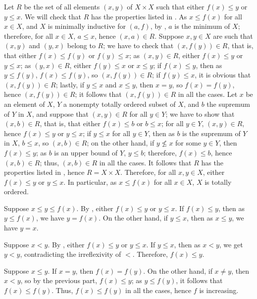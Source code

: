 \documentclass{article}
\begin{document}
\begin{solution}[\ref{exe:yf8euudc}]
  \label{sol:k2kxymc8}
  Let \(R\) be the set of all elements \((x, y)\) of \(X \times X\)
  such that either \(f(x) \leq y\) or \(y \leq x\).  We will check
  that \(R\) has the properties listed in .  As
  \(x \leq f(x)\) for all \(x \in X\), and \(X\) is minimally
  inductive for \((a, f)\), by , \(a\) is the
  minimum of \(X\); therefore, for all \(x \in X\), \(a \leq x\),
  hence \((x, a) \in R\).  Suppose \(x, y \in X\) are such that
  \((x,y)\) and \((y, x)\) belong to \(R\); we have to check that
  \((x, f(y)) \in R\), that is, that either \(f(x) \leq f(y)\) or
  \(f(y) \leq x\); as \((x, y) \in R\), either \(f(x) \leq y\) or
  \(y \leq x\); as \((y, x) \in R\), either \(f(y) \leq x\) or
  \(x \leq y\); if \(f(x) \leq y\), then as \(y \leq f(y)\),
  \(f(x) \leq f(y)\), so \((x, f(y)) \in R\); if \(f(y) \leq x\), it
  is obvious that \((x,f(y)) \in R\); lastly, if \(y \leq x\) and
  \(x \leq y\), then \(x = y\), so \(f(x) = f(y)\), hence
  \((x,f(y)) \in R\); it follows that \((x, f(y)) \in R\) in all the
  cases.  Let \(x\) be an element of \(X\), \(Y\) a nonempty totally
  ordered subset of \(X\), and \(b\) the supremum of \(Y\) in \(X\),
  and suppose that \((x, y) \in R\) for all \(y \in Y\); we have to
  show that \((x, b) \in R\), that is, that either \(f(x) \leq b\) or
  \(b \leq x\); for all \(y \in Y\), \((x, y) \in R\), hence
  \(f(x) \leq y\) or \(y \leq x\); if \(y \leq x\) for all
  \(y \in Y\), then as \(b\) is the supremum of \(Y\) in \(X\),
  \(b \leq x\), so \((x, b) \in R\); on the other hand, if
  \(y \nleq x\) for some \(y \in Y\), then \(f(x) \leq y\); as \(b\)
  is an upper bound of \(Y\), \(y \leq b\); therefore,
  \(f(x) \leq b\), hence \((x, b) \in R\); thus, \((x, b) \in R\) in
  all the cases.  It follows that \(R\) has the properties listed in
  , hence \(R = X \times X\).  Therefore, for all
  \(x, y \in X\), either \(f(x) \leq y\) or \(y \leq x\).  In
  particular, as \(x \leq f(x)\) for all \(x \in X\), \(X\) is totally
  ordered.
\end{solution}

\begin{solution}[\ref{exe:htz5ftfy}]
  \label{sol:h2e8o5az}
  Suppose \(x \leq y \leq f(x)\).  By , either
  \(f(x) \leq y\) or \(y \leq x\).  If \(f(x) \leq y\), then as
  \(y \leq f(x)\), we have \(y = f(x)\).  On the other hand, if
  \(y \leq x\), then as \(x \leq y\), we have \(y = x\).

  Suppose \(x < y\).  By , either \(f(x) \leq y\)
  or \(y \leq x\).  If \(y \leq x\), then as \(x < y\), we get
  \(y < y\), contradicting the irreflexivity of \(<\).  Therefore,
  \(f(x) \leq y\).

  Suppose \(x \leq y\).  If \(x = y\), then \(f(x) = f(y)\).  On the
  other hand, if \(x \neq y\), then \(x < y\), so by the previous
  part, \(f(x) \leq y\); as \(y \leq f(y)\), it follows that
  \(f(x) \leq f(y)\).  Thus, \(f(x) \leq f(y)\) in all the cases,
  hence \(f\) is increasing.
\end{solution}
\end{document}
